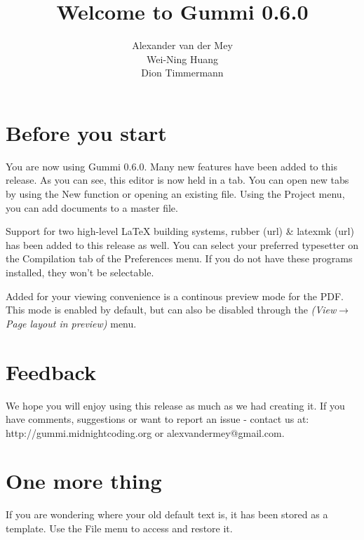\documentclass[a4paper,11pt]{article}
\title{\textbf{Welcome to Gummi 0.6.0}}
\author{Alexander van der Mey\\
		Wei-Ning Huang\\
		Dion Timmermann}
\begin{document}
\maketitle


\section{Before you start}

You are now using Gummi 0.6.0. Many new features have been added to this release. As you can see, this editor is now held in a tab. You can open new tabs by using the New function or opening an existing file. Using the Project menu, you can add documents to a master file. 

Support for two high-level LaTeX building systems, rubber (url) \& latexmk (url) has been added to this release as well. You can select your preferred typesetter on the Compilation tab of the Preferences menu. If you do not have these programs installed, they won't be selectable. 

Added for your viewing convenience is a continous preview mode for the PDF. This mode is enabled by default, but can also be disabled through the \emph{(View$\rightarrow$Page layout in preview)} menu. 

\section{Feedback}
We hope you will enjoy using this release as much as we had creating it. If you have comments, suggestions or want to report an issue - contact us at:\\
http://gummi.midnightcoding.org or alexvandermey@gmail.com. 

\section{One more thing}
If you are wondering where your old default text is, it has been stored as a template. Use the File menu to access and restore it. 
\end{document}
